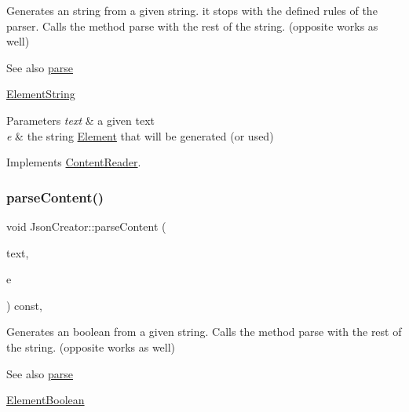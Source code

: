 Generates an string from a given string. it stops with the defined rules of the parser. Calls the method parse with the rest of the string. (opposite works as well) \begin{DoxySeeAlso}{See also}
\mbox{\hyperlink{classJsonCreator_a505ff309c6b144d29478804b0e187c6f}{parse}} 

\mbox{\hyperlink{classElementString}{Element\+String}}
\end{DoxySeeAlso}

\begin{DoxyParams}{Parameters}
{\em text} & a given text \\
\hline
{\em e} & the string \mbox{\hyperlink{classElement}{Element}} that will be generated (or used) \\
\hline
\end{DoxyParams}


Implements \mbox{\hyperlink{classContentReader_a310678ddc37a05aca2f13db73b22abe5}{Content\+Reader}}.

\mbox{\label{classJsonCreator_a95fb65046a7467b8e48feaf92a62b40c}} 
\subsubsection{\texorpdfstring{parse\+Content()}{parseContent()}\hspace{0.1cm}{\footnotesize\ttfamily [3/6]}}
{\footnotesize\ttfamily void Json\+Creator\+::parse\+Content (\begin{DoxyParamCaption}\item[{std\+::string \&}]{text,  }\item[{\mbox{\hyperlink{classElementBoolean}{Element\+Boolean}} $\ast$}]{e }\end{DoxyParamCaption}) const\hspace{0.3cm}{\ttfamily [override]}, {\ttfamily [virtual]}}

Generates an boolean from a given string. Calls the method parse with the rest of the string. (opposite works as well) \begin{DoxySeeAlso}{See also}
\mbox{\hyperlink{classJsonCreator_a505ff309c6b144d29478804b0e187c6f}{parse}} 

\mbox{\hyperlink{classElementBoolean}{Element\+Boolean}}
\end{DoxySeeAlso}

